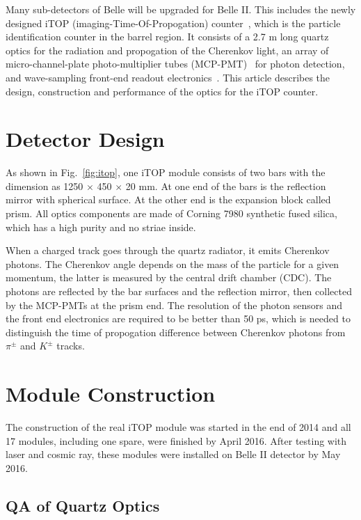 \documentclass{llncs}
\begin{document}
Many sub-detectors of Belle will be upgraded for Belle II. This
includes the newly designed iTOP (imaging-Time-Of-Propogation)
counter~\cite{itop-oshima, itop-akatsu, itop-oshima2, itop-enari},
which is the particle identification counter in the barrel region. It
consists of a 2.7 m long quartz optics for the radiation and
propogation of the Cherenkov light, an array of micro-channel-plate
photo-multiplier tubes (MCP-PMT)~\cite{mcppmt} for photon detection,
and wave-sampling front-end readout electronics~\cite{itop-irsx,
  itop-irsx1}. This article describes the design, construction and
performance of the optics for the iTOP counter.

\section{Detector Design}

As shown in Fig.~\ref{fig:itop}, one iTOP module consists of two bars
with the dimension as 1250 $\times$ 450 $\times$ 20 mm. At one end of
the bars is the reflection mirror with spherical surface. At the other
end is the expansion block called prism. All optics components are
made of Corning 7980 synthetic fused silica, which has a high purity
and no striae inside.

When a charged track goes through the quartz radiator, it emits
Cherenkov photons. The Cherenkov angle depends on the mass of the
particle for a given momentum, the latter is measured by the central
drift chamber (CDC). The photons are reflected by the bar surfaces and
the reflection mirror, then collected by the MCP-PMTs at the prism
end. The resolution of the photon sensors and the front end
electronics are required to be better than 50 ps, which is needed to
distinguish the time of propogation difference between Cherenkov
photons from $\pi^{\pm}$ and $K^{\pm}$ tracks.

\section{Module Construction}

The construction of the real iTOP module was started in the end of
2014 and all 17 modules, including one spare, were finished by April
2016. After testing with laser and cosmic ray, these modules were
installed on Belle II detector by May 2016.

\subsection{QA of Quartz Optics}
\end{document}
